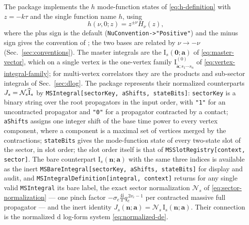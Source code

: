 \documentclass[11pt,a4paper]{article}
\numberwithin{table}{section}
\newcommand{\ii}{\mathrm i}
\newcommand{\cN}{\mathcal N}
\begin{document}
The package implements the $h$ mode-function states of \eqref{eq:h-definition} with $z=-k\tau$ and the
single function name $h$, using
\begin{equation}
  h(\nu,0;z)=z^{\pm\nu}H_\nu(z),
  \label{eq:positive-order-h}
\end{equation}
where the plus sign is the default (\texttt{NuConvention->"Positive"}) and the minus sign gives
the convention of \cite{Chen:2023iix}; the two bases are related by $\nu\to-\nu$
(Sec.~\ref{sec:conventions}). The master integrals are the
$\text{I}_s(\bm 0;\bm a)$ of \eqref{eq:master-vector}, which on a single vertex is the one-vertex
family $\text{I}^{(0)}_{\tilde{\bm a};s_1\cdots s_n}$ of \eqref{eq:vertex-integral-family}; for
multi-vertex correlators they are the products and
sub-sector integrals of Sec.~\ref{sec:dlog}. The package represents their normalized counterparts
$J_s=\cN_s\widehat{\text I}_s$ by
\texttt{MSIntegral[sectorKey, aShifts, stateBits]}: \texttt{sectorKey} is a binary string over
the root propagators in the input order, with \texttt{"1"} for an uncontracted propagator and
\texttt{"0"} for a propagator contracted by a contact; \texttt{aShifts} assigns one integer shift of
the base time power to every vertex component, where a component is a maximal set of vertices
merged by the contractions; \texttt{stateBits} gives the mode-function state of every two-state slot of the
sector, in slot order; the slot order itself is that of \texttt{MSSlotRegistry[context, sector]}.
The bare counterpart $\text{I}_s(\bm n;\bm a)$ with the same three indices is available as the inert
\texttt{MSBareIntegral[sectorKey, aShifts, stateBits]} for display and audit, and
\texttt{MSIntegralDefinition[integral, context]} returns for any single valid \texttt{MSIntegral}
its bare label, the exact sector normalization $\cN_s$ of \eqref{eq:sector-normalization} --- one
pinch factor $-\sigma_e\frac{4\ii}{\pi}q_e^{\,2\nu_e-1}$ per contracted massive full propagator ---
and the inert identity
$J_s(\bm n;\bm a)=\cN_s\,\text{I}_s(\bm n;\bm a)$.
Their connection is the normalized d log-form system
\eqref{eq:normalized-de}.
\end{document}
